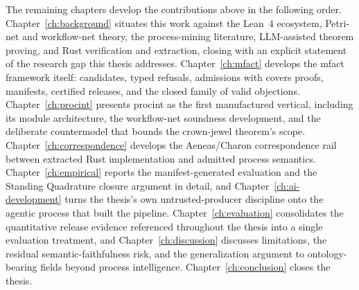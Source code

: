 The remaining chapters develop the contributions above in the following
order. Chapter~\ref{ch:background} situates this work against the Lean~4
ecosystem, Petri-net and workflow-net theory, the process-mining
literature, LLM-assisted theorem proving, and Rust verification and
extraction, closing with an explicit statement of the research gap this
thesis addresses. Chapter~\ref{ch:mfact} develops the \textsf{mfact}
framework itself: candidates, typed refusals, admissions with covers
proofs, manifests, certified releases, and the closed family of valid
objections. Chapter~\ref{ch:procint} presents \textsf{procint} as the
first manufactured vertical, including its module architecture, the
workflow-net soundness development, and the deliberate countermodel that
bounds the crown-jewel theorem's scope. Chapter~\ref{ch:correspondence}
develops the Aeneas/Charon correspondence rail between extracted Rust
implementation and admitted process semantics. Chapter~\ref{ch:empirical}
reports the manifest-generated evaluation and the Standing Quadrature
closure argument in detail, and Chapter~\ref{ch:ai-development} turns the
thesis's own untrusted-producer discipline onto the agentic process that
built the pipeline. Chapter~\ref{ch:evaluation} consolidates the
quantitative release evidence referenced throughout the thesis into a
single evaluation treatment, and Chapter~\ref{ch:discussion} discusses
limitations, the residual semantic-faithfulness risk, and the
generalization argument to ontology-bearing fields beyond process
intelligence. Chapter~\ref{ch:conclusion} closes the thesis.
